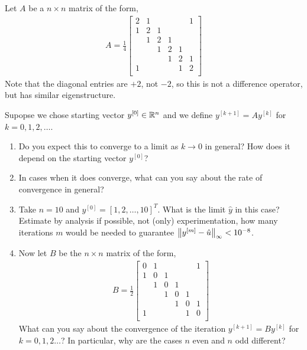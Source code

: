 \documentclass[10pt]{article}
\begin{document}
\begin{problem}
Let \( A \) be a \( n\times n \) matrix of the form,
\begin{align*}
    A = \frac{1}{4}
    \left[\begin{array}{cccccc}
        2 & 1 & & & & 1 \\
        1 & 2 & 1 \\
        & 1 & 2 & 1 \\
        & & 1 & 2 & 1 \\
        & & & 1 & 2 & 1 \\
        1 & & & & 1 & 2 \\
    \end{array}\right]
\end{align*}
Note that the diagonal entries are \( +2 \), not \( -2 \), so this is not a difference operator, but has similar eigenstructure.

    Supopse we chose starting vector \( y^{[0]} \in \mathbb{R}^n \) and we define \( y^{[k+1]} = A y^{[k]} \) for \( k=0,1,2, \ldots \).
\begin{enumerate}[nolistsep,label=(\alph*)]
    \item Do you expect this to converge to a limit as \( k\to 0 \) in general? How does it depend on the starting vector \( y^{[0]} \)?
    \item In cases when it does converge, what can you say about the rate of convergence in general?
    \item Take \( n=10 \) and \( y^{[0]} = [1,2,\ldots, 10]^T \). What is the limit \( \hat{y} \) in this case? Estimate by analysis if possible, not (only) experimentation, how many iterations \( m \) would be needed to guarantee \( \left\lVert y^{[m]} - \hat{u}\right\rVert_\infty < 10^{-8} \).
    \item Now let \( B \) be the \( n\times n \) matrix of the form,
    \begin{align*}
    B = \frac{1}{2}
    \left[\begin{array}{cccccc}
        0 & 1 & & & & 1 \\
        1 & 0 & 1 \\
        & 1 & 0 & 1 \\
        & & 1 & 0 & 1 \\
        & & & 1 & 0 & 1 \\
        1 & & & & 1 & 0 \\
    \end{array}\right]
    \end{align*}
        What can you say about the convergence of the iteration \( y^{[k+1]} = B y^{[k]} \) for \( k=0,1,2\ldots  \)? In particular, why are the cases \( n \) even and \( n \) odd different?
\end{enumerate}
\end{problem}
\end{document}
